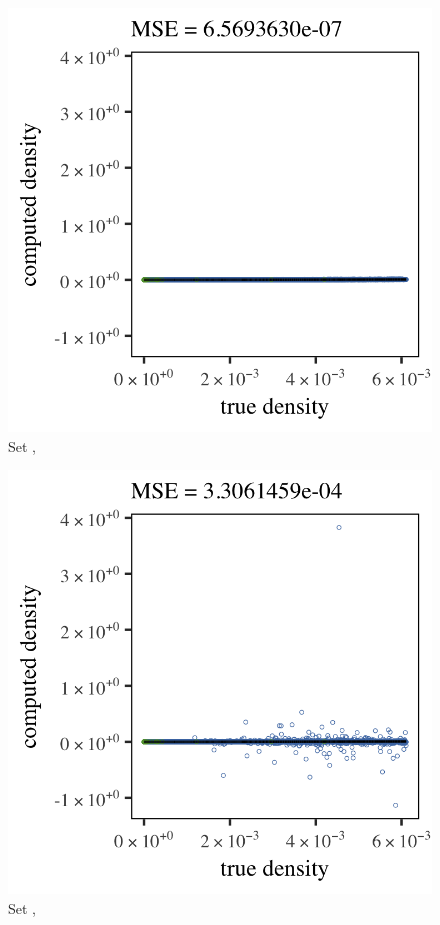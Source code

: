 \begin{subfigure}{0.23\textwidth}
	\centering
	\includegraphics[keepaspectratio=true, width=\textwidth, height=0.23\textheight]{4/img/all/results_baakman_5_60000_mbe_silverman}
	\caption{Set \baakmanFive, \mbe}
	\label{fig:4:results:mbe:baakman5}
\end{subfigure}	
\begin{subfigure}{0.23\textwidth}
	\centering
	\includegraphics[keepaspectratio=true, width=\textwidth, height=0.23\textheight]{4/img/all/results_baakman_5_60000_sambe_silverman}
	\caption{Set \baakmanFive, \sambe}
	\label{fig:4:results:sambe:baakman5}
\end{subfigure}	